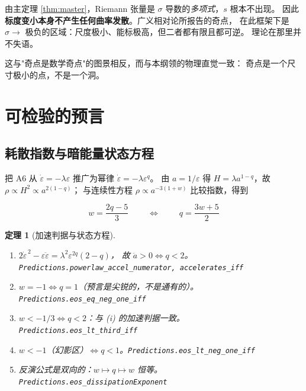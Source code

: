 \documentclass[11pt,a4paper]{article}
\theoremstyle{sudef}
\newtheorem{theorem}{定理}[section]
\newcommand{\lean}[1]{\hfill{\small\color{lncol}\texttt{#1}}}
\begin{document}
由主定理 \ref{thm:master}，Riemann 张量是 $\sigma$ 导数的\emph{多项式}，$s$ 根本不出现。
因此\textbf{标度变小本身不产生任何曲率发散}。广义相对论所报告的奇点，
在此框架下是 $\sigma\to$ 极负的区域：尺度极小、能标极高，但二者都有限且都可逆。
理论在那里并不失语。

这与"奇点是数学奇点"的图景相反，而与本纲领的物理直觉一致：
奇点是一个尺寸极小的点，不是一个洞。

\section{可检验的预言}\label{sec:pred}

\subsection{耗散指数与暗能量状态方程}

把 A6 从 $\dot\varepsilon=-\lambda\varepsilon$ 推广为幂律 $\dot\varepsilon=-\lambda\varepsilon^{q}$。
由 $a=1/\varepsilon$ 得 $H=\lambda a^{1-q}$，故 $\rho\propto H^2\propto a^{2(1-q)}$；
与连续性方程 $\rho\propto a^{-3(1+w)}$ 比较指数，得到

\begin{mdframed}[linecolor=axcol,linewidth=0.9pt,backgroundcolor=axcol!4]
\[
\boxed{\;w=\frac{2q-5}{3}\;}
\qquad\Longleftrightarrow\qquad
\boxed{\;q=\frac{3w+5}{2}\;}
\]
\end{mdframed}

\begin{theorem}[加速判据与状态方程]\label{thm:eos}
\begin{enumerate}[label=(\roman*),leftmargin=2em]
\item $2\dot\varepsilon^{\,2}-\varepsilon\ddot\varepsilon=\lambda^2\varepsilon^{2q}(2-q)$，
      故 $\ddot a>0 \iff q<2$。\lean{Predictions.powerlaw\_accel\_numerator,
      accelerates\_iff}
\item $w=-1 \iff q=1$（预言是尖锐的，不是通有的）。
      \lean{Predictions.eos\_eq\_neg\_one\_iff}
\item $w<-1/3 \iff q<2$：与 (i) 的加速判据一致。
      \lean{Predictions.eos\_lt\_third\_iff}
\item $w<-1$（幻影区）$\iff q<1$。\lean{Predictions.eos\_lt\_neg\_one\_iff}
\item 反演公式是双向的：$w\mapsto q\mapsto w$ 恒等。
      \lean{Predictions.eos\_dissipationExponent}
\end{enumerate}
\end{theorem}
\end{document}
